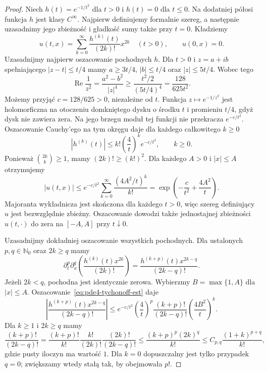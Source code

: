 \begin{proof}
Niech $h(t)=e^{-1/t^2}$ dla $t>0$ i $h(t)=0$
dla $t\leq0$. Na dodatniej półosi funkcja $h$
jest klasy $C^\infty$. Najpierw definiujemy formalnie
szereg, a następnie uzasadnimy jego zbieżność
i gładkość sumy także przy $t=0$. Kładziemy
\begin{equation}\label{eq:pde4-tychonoff}
 u(t,x)=\sum_{k=0}^\infty\frac{h^{(k)}(t)}{(2k)!}
 x^{2k}\quad(t>0),\qquad u(0,x)=0.
\end{equation}
Uzasadnijmy najpierw oszacowanie pochodnych $h$.
Dla $t>0$ i $z=a+ib$ spełniającego $|z-t|\leq t/4$
mamy $a\geq3t/4$, $|b|\leq t/4$ oraz $|z|\leq5t/4$.
Wobec tego
\[
 \operatorname{Re}\frac1{z^2}
 =\frac{a^2-b^2}{|z|^4}
 \geq\frac{t^2/2}{(5t/4)^4}
 =\frac{128}{625t^2}.
\]
Możemy przyjąć $c=128/625>0$, niezależne od $t$.
Funkcja $z\mapsto e^{-1/z^2}$ jest holomorficzna
na otoczeniu domkniętego dysku o środku $t$
i promieniu $t/4$, gdyż dysk nie zawiera zera.
Na jego brzegu moduł tej funkcji nie przekracza
$e^{-c/t^2}$. Oszacowanie Cauchy'ego na tym okręgu
daje dla każdego całkowitego $k\geq0$
\begin{equation}\label{eq:pde4-tychonoff-est}
 |h^{(k)}(t)|\leq k!\left(\frac4t\right)^k
 e^{-c/t^2},\qquad k\geq0.
\end{equation}
Ponieważ $\binom{2k}{k}\geq1$, mamy $(2k)!\geq(k!)^2$.
Dla każdego $A>0$ i $|x|\leq A$
otrzymujemy
\[
 |u(t,x)|\leq e^{-c/t^2}
 \sum_{k=0}^\infty\frac{(4A^2/t)^k}{k!}
 =\exp\!\left(-\frac c{t^2}+\frac{4A^2}t\right).
\]
Majoranta wykładnicza jest skończona dla każdego
$t>0$, więc szereg definiujący $u$ jest bezwzględnie
zbieżny. Oszacowanie dowodzi także jednostajnej
zbieżności $u(t,\cdot)$ do zera na $[-A,A]$
przy $t\downarrow0$.

Uzasadnijmy dokładniej oszacowanie wszystkich pochodnych.
Dla ustalonych $p,q\in\mathbb N_0$ oraz $2k\geq q$ mamy
\[
 \partial_t^p\partial_x^q
 \left(\frac{h^{(k)}(t)x^{2k}}{(2k)!}\right)
 =\frac{h^{(k+p)}(t)x^{2k-q}}{(2k-q)!}.
\]
Jeżeli $2k<q$, pochodna jest identycznie zerowa.
Wybierzmy $B=\max\{1,A\}$ dla $|x|\leq A$.
Oszacowanie~\eqref{eq:pde4-tychonoff-est} daje
\[
 \left|\frac{h^{(k+p)}(t)x^{2k-q}}{(2k-q)!}\right|
 \le e^{-c/t^2}\left(\frac4t\right)^p
 \frac{(k+p)!}{(2k-q)!}
 \left(\frac{4B^2}{t}\right)^k.
\]
Dla $k\geq1$ i $2k\geq q$ mamy
\[
 \frac{(k+p)!}{(2k-q)!}
 =\frac{(k+p)!}{k!}\frac{k!}{(2k)!}
   \frac{(2k)!}{(2k-q)!}
 \leq\frac{(k+p)^p(2k)^q}{k!}
 \leq C_{p,q}\frac{(1+k)^{p+q}}{k!},
\]
gdzie pusty iloczyn ma wartość $1$.
Dla $k=0$ dopuszczalny jest tylko przypadek $q=0$;
zwiększamy wtedy stałą tak, by obejmowała $p!$.


\end{proof}
